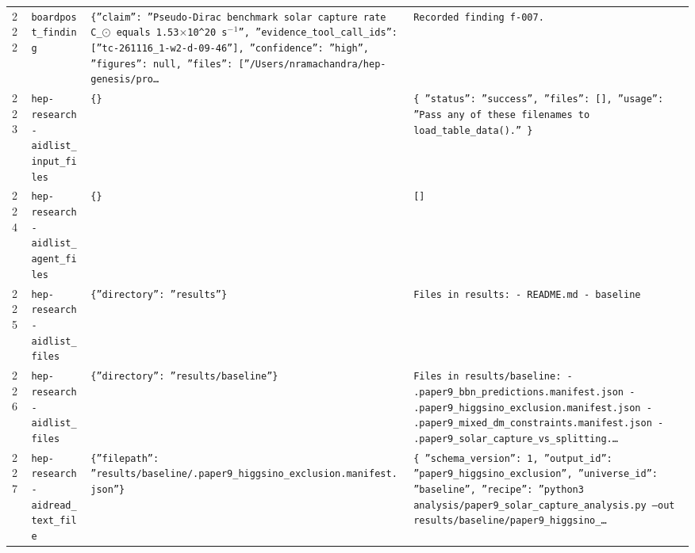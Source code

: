 \documentclass[11pt,a4paper]{article}
\begin{document}
\begin{longtable}{@{}p{}p{}p{}p{}@{}}
222 & \texttt{board}\newline\texttt{post\_\allowbreak{}finding} & \texttt{\{''claim'':\allowbreak{} ''Pseudo-Dirac benchmark solar capture rate C\_\allowbreak{}$\odot$ equals 1.53$\times$10\textasciicircum{}\allowbreak{}20 s$^-$$^1$'',\allowbreak{} ''evidence\_\allowbreak{}tool\_\allowbreak{}call\_\allowbreak{}ids'':\allowbreak{} [''tc-261116\_\allowbreak{}1-w2-d-09-46'']\allowbreak{},\allowbreak{} ''confidence'':\allowbreak{} ''high'',\allowbreak{} ''figures'':\allowbreak{} null,\allowbreak{} ''files'':\allowbreak{} [''/\allowbreak{}Users/\allowbreak{}nramachandra/\allowbreak{}hep-genesis/\allowbreak{}pro\ldots{}\allowbreak{}} & \texttt{Recorded finding f-007.} \\
223 & \texttt{hep-research-aid}\newline\texttt{list\_\allowbreak{}input\_\allowbreak{}files} & \texttt{\{\}\allowbreak{}} & \texttt{\{   ''status'':\allowbreak{} ''success'',\allowbreak{}   ''files'':\allowbreak{} []\allowbreak{},\allowbreak{}   ''usage'':\allowbreak{} ''Pass any of these filenames to load\_\allowbreak{}table\_\allowbreak{}data()\allowbreak{}.'' \}\allowbreak{}} \\
224 & \texttt{hep-research-aid}\newline\texttt{list\_\allowbreak{}agent\_\allowbreak{}files} & \texttt{\{\}\allowbreak{}} & \texttt{[]\allowbreak{}} \\
225 & \texttt{hep-research-aid}\newline\texttt{list\_\allowbreak{}files} & \texttt{\{''directory'':\allowbreak{} ''results''\}\allowbreak{}} & \texttt{Files in results:\allowbreak{}   - README.md   - baseline} \\
226 & \texttt{hep-research-aid}\newline\texttt{list\_\allowbreak{}files} & \texttt{\{''directory'':\allowbreak{} ''results/\allowbreak{}baseline''\}\allowbreak{}} & \texttt{Files in results/\allowbreak{}baseline:\allowbreak{}   - .paper9\_\allowbreak{}bbn\_\allowbreak{}predictions.manifest.json   - .paper9\_\allowbreak{}higgsino\_\allowbreak{}exclusion.manifest.json   - .paper9\_\allowbreak{}mixed\_\allowbreak{}dm\_\allowbreak{}constraints.manifest.json   - .paper9\_\allowbreak{}solar\_\allowbreak{}capture\_\allowbreak{}vs\_\allowbreak{}splitting.\ldots{}\allowbreak{}} \\
227 & \texttt{hep-research-aid}\newline\texttt{read\_\allowbreak{}text\_\allowbreak{}file} & \texttt{\{''filepath'':\allowbreak{} ''results/\allowbreak{}baseline/\allowbreak{}.paper9\_\allowbreak{}higgsino\_\allowbreak{}exclusion.manifest.json''\}\allowbreak{}} & \texttt{\{   ''schema\_\allowbreak{}version'':\allowbreak{} 1,\allowbreak{}   ''output\_\allowbreak{}id'':\allowbreak{} ''paper9\_\allowbreak{}higgsino\_\allowbreak{}exclusion'',\allowbreak{}   ''universe\_\allowbreak{}id'':\allowbreak{} ''baseline'',\allowbreak{}   ''recipe'':\allowbreak{} ''python3 analysis/\allowbreak{}paper9\_\allowbreak{}solar\_\allowbreak{}capture\_\allowbreak{}analysis.py --out results/\allowbreak{}baseline/\allowbreak{}paper9\_\allowbreak{}higgsino\_\allowbreak{}\ldots{}\allowbreak{}} \\

\end{longtable}
\end{document}
